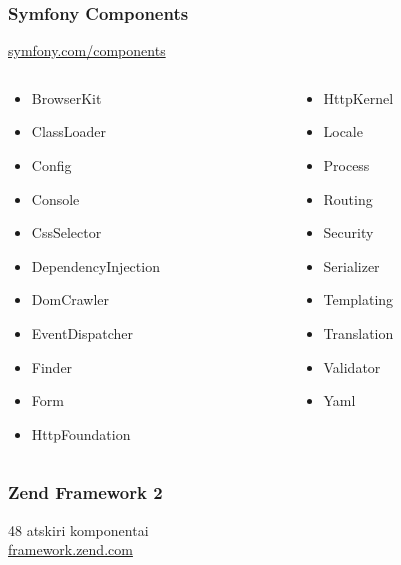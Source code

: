 \documentclass[12pt,a4paper]{beamer}
\begin{document}
\begin{frame}
    \frametitle{Symfony Components}
    \url{symfony.com/components}
    {\scriptsize
        \begin{columns}[t]
            \begin{column}{5cm}
                \begin{itemize}
                    \item BrowserKit
                    \item ClassLoader
                    \item Config
                    \item Console
                    \item CssSelector
                    \item DependencyInjection
                    \item DomCrawler
                    \item EventDispatcher
                    \item Finder
                    \item Form
                    \item HttpFoundation
                \end{itemize}
            \end{column}
            \begin{column}{5cm}
                \begin{itemize}
                    \item HttpKernel	
                    \item Locale	
                    \item Process	
                    \item Routing	
                    \item Security	 	
                    \item Serializer	 	
                    \item Templating	
                    \item Translation	 	
                    \item Validator	 	
                    \item Yaml
                \end{itemize}
            \end{column}
        \end{columns}
    }
\end{frame}
\begin{frame}
    \frametitle{Zend Framework 2}

    {\Huge 48 atskiri komponentai}\\
    \url{framework.zend.com}
\end{frame}
\end{document}
